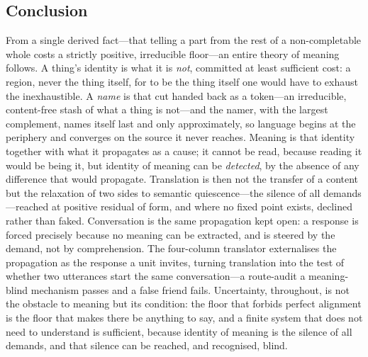 \documentclass[twocolumn,11pt,a4paper]{article}
\theoremstyle{sup}
\theoremstyle{definition}
\theoremstyle{remark}
\begin{document}
\subsection{Conclusion}

From a single derived fact---that telling a part from the rest of a
non-completable whole costs a strictly positive, irreducible floor---an entire
theory of meaning follows. A thing's identity is what it is \emph{not},
committed at least sufficient cost: a region, never the thing itself, for to be
the thing itself one would have to exhaust the inexhaustible. A \emph{name} is
that cut handed back as a token---an irreducible, content-free stash of what a
thing is not---and the namer, with the largest complement, names itself last and
only approximately, so language begins at the periphery and converges on the
source it never reaches. Meaning is that
identity together with what it propagates as a cause; it cannot be read, because
reading it would be being it, but identity of meaning can be \emph{detected}, by
the absence of any difference that would propagate. Translation is then not the
transfer of a content but the relaxation of two sides to semantic
quiescence---the silence of all demands---reached at positive residual of form,
and where no fixed point exists, declined rather than faked. Conversation is the
same propagation kept open: a response is forced precisely because no meaning can
be extracted, and is steered by the demand, not by comprehension. The
four-column translator externalises the propagation as the response a unit
invites, turning translation into the test of whether two utterances start the
same conversation---a route-audit a meaning-blind mechanism passes and a false
friend fails. Uncertainty, throughout, is not the obstacle to meaning but its
condition: the floor that forbids perfect alignment is the floor that makes there
be anything to say, and a finite system that does not need to understand is
sufficient, because identity of meaning is the silence of all demands, and that
silence can be reached, and recognised, blind.



\end{document}
